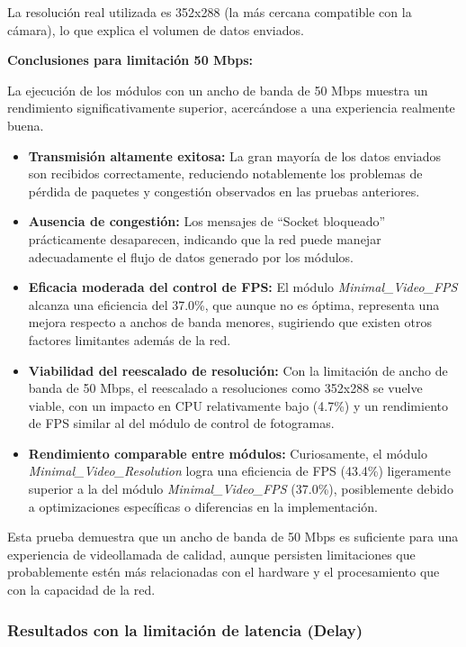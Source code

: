 La resolución real utilizada es 352x288 (la más cercana compatible con la cámara), lo que explica el volumen de datos enviados.
\vspace{\baselineskip}

\textbf{Conclusiones para limitación 50 Mbps:}

La ejecución de los módulos con un ancho de banda de 50 Mbps muestra un rendimiento significativamente superior, acercándose a una experiencia realmente buena.
\begin{itemize}
    \item \textbf{Transmisión altamente exitosa:} La gran mayoría de los datos enviados son recibidos correctamente, reduciendo notablemente los problemas de pérdida de paquetes y congestión observados en las pruebas anteriores.
    \item \textbf{Ausencia de congestión:} Los mensajes de ``Socket bloqueado'' prácticamente desaparecen, indicando que la red puede manejar adecuadamente el flujo de datos generado por los módulos.
    \item \textbf{Eficacia moderada del control de FPS:} El módulo \textit{Minimal\_Video\_FPS} alcanza una eficiencia del 37.0\%, que aunque no es óptima, representa una mejora respecto a anchos de banda menores, sugiriendo que existen otros factores limitantes además de la red.
    \item \textbf{Viabilidad del reescalado de resolución:} Con la limitación de ancho de banda de 50 Mbps, el reescalado a resoluciones como 352x288 se vuelve viable, con un impacto en CPU relativamente bajo (4.7\%) y un rendimiento de FPS similar al del módulo de control de fotogramas.
    \item \textbf{Rendimiento comparable entre módulos:} Curiosamente, el módulo \textit{Minimal\_Video\_Resolution} logra una eficiencia de FPS (43.4\%) ligeramente superior a la del módulo \textit{Minimal\_Video\_FPS} (37.0\%), posiblemente debido a optimizaciones específicas o diferencias en la implementación.
\end{itemize}

Esta prueba demuestra que un ancho de banda de 50 Mbps es suficiente para una experiencia de videollamada de calidad, aunque persisten limitaciones que probablemente estén más relacionadas con el hardware y el procesamiento que con la capacidad de la red.

\newpage

\subsubsection{Resultados con la limitación de latencia (Delay)}

